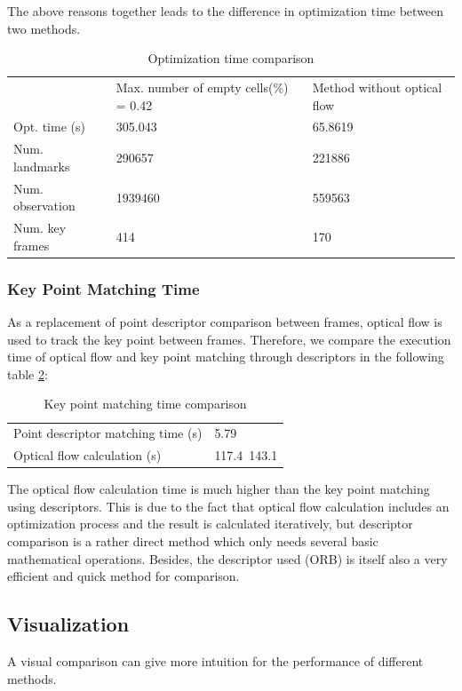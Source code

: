 \documentclass[conference]{IEEEtran}
\begin{document}
The above reasons together leads to the difference in optimization time between two methods.

\begin{table}
	\centering
	\caption{Optimization time comparison}
	\label{tab:optimization}
	\begin{tabular}{lll}
		  & Max. number of empty cells(\%) = 0.42 & Method without optical flow   \\
		Opt. time (s)  & 305.043 & 65.8619\\
		Num. landmarks &290657 &221886\\
		 Num. observation & 1939460 & 559563 \\        
		 Num. key frames & 414 & 170                 
	\end{tabular}
\end{table}


\subsubsection{Key Point Matching Time}
As a replacement of point descriptor comparison between frames, optical flow is used to track the key point between frames. Therefore, we compare the execution time of optical flow and key point matching through descriptors in the following table \ref{tab:matching}:

\begin{table}
	\centering
	\caption{Key point matching time comparison}
	\label{tab:matching}
	\begin{tabular}{ll}
		Point descriptor matching time (s) &5.79\\
		Optical flow calculation (s) & 117.4~143.1   \\              
	\end{tabular}
\end{table}

The optical flow calculation time is much higher than the key point matching using descriptors. This is due to the fact that optical flow calculation includes an optimization process and the result is calculated iteratively, but descriptor comparison is a rather direct method which only needs several basic mathematical operations. Besides, the descriptor used (ORB) is itself also a very efficient and quick method for comparison.


\subsection{Visualization}
A visual comparison can give more intuition for the performance of different methods. 
\end{document}

